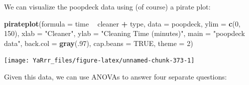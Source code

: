 \documentclass[]{book}
\newenvironment{Shaded}{\begin{snugshade}}{\end{snugshade}}
\newcommand{\KeywordTok}[1]{\textcolor[rgb]{0.13,0.29,0.53}{\textbf{#1}}}
\newcommand{\DataTypeTok}[1]{\textcolor[rgb]{0.13,0.29,0.53}{#1}}
\newcommand{\DecValTok}[1]{\textcolor[rgb]{0.00,0.00,0.81}{#1}}
\newcommand{\StringTok}[1]{\textcolor[rgb]{0.31,0.60,0.02}{#1}}
\newcommand{\OtherTok}[1]{\textcolor[rgb]{0.56,0.35,0.01}{#1}}
\newcommand{\OperatorTok}[1]{\textcolor[rgb]{0.81,0.36,0.00}{\textbf{#1}}}
\newcommand{\NormalTok}[1]{#1}
\theoremstyle{definition}
\theoremstyle{definition}
\theoremstyle{remark}
\begin{document}
We can visualize the poopdeck data using (of course) a pirate plot:

\begin{Shaded}
\begin{Highlighting}[]
\KeywordTok{pirateplot}\NormalTok{(}\DataTypeTok{formula =}\NormalTok{ time }\OperatorTok{~}\StringTok{ }\NormalTok{cleaner }\OperatorTok{+}\StringTok{ }\NormalTok{type,}
           \DataTypeTok{data =}\NormalTok{ poopdeck,}
           \DataTypeTok{ylim =} \KeywordTok{c}\NormalTok{(}\DecValTok{0}\NormalTok{, }\DecValTok{150}\NormalTok{),}
           \DataTypeTok{xlab =} \StringTok{"Cleaner"}\NormalTok{,}
           \DataTypeTok{ylab =} \StringTok{"Cleaning Time (minutes)"}\NormalTok{,}
           \DataTypeTok{main =} \StringTok{"poopdeck data"}\NormalTok{,}
           \DataTypeTok{back.col =} \KeywordTok{gray}\NormalTok{(.}\DecValTok{97}\NormalTok{), }
           \DataTypeTok{cap.beans =} \OtherTok{TRUE}\NormalTok{, }
           \DataTypeTok{theme =} \DecValTok{2}\NormalTok{)}
\end{Highlighting}
\end{Shaded}

\begin{center}\texttt{[image: YaRrr\_files/figure-latex/unnamed-chunk-373-1]} \end{center}

Given this data, we can use ANOVAs to answer four separate questions:
\end{document}
